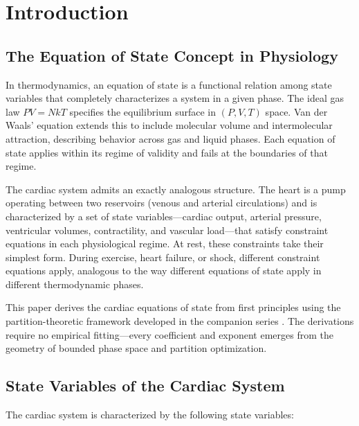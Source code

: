 \documentclass[10pt,twocolumn,a4paper]{article}
\theoremstyle{remark}
\begin{document}
\section{Introduction}
\label{sec:introduction}

\subsection{The Equation of State Concept in Physiology}

In thermodynamics, an equation of state is a functional relation among state variables that completely characterizes a system in a given phase. The ideal gas law $PV = NkT$ specifies the equilibrium surface in $(P, V, T)$ space. Van der Waals' equation extends this to include molecular volume and intermolecular attraction, describing behavior across gas and liquid phases. Each equation of state applies within its regime of validity and fails at the boundaries of that regime.

The cardiac system admits an exactly analogous structure. The heart is a pump operating between two reservoirs (venous and arterial circulations) and is characterized by a set of state variables—cardiac output, arterial pressure, ventricular volumes, contractility, and vascular load—that satisfy constraint equations in each physiological regime. At rest, these constraints take their simplest form. During exercise, heart failure, or shock, different constraint equations apply, analogous to the way different equations of state apply in different thermodynamic phases.

This paper derives the cardiac equations of state from first principles using the partition-theoretic framework developed in the companion series \cite{sachikonye2024transport,sachikonye2024gas,sachikonye2024mass,sachikonye2024cardio}. The derivations require no empirical fitting—every coefficient and exponent emerges from the geometry of bounded phase space and partition optimization.

\subsection{State Variables of the Cardiac System}

The cardiac system is characterized by the following state variables:
\end{document}

